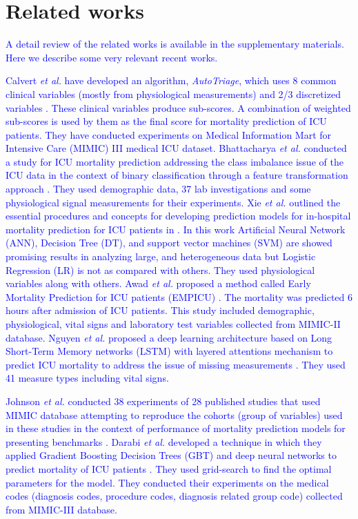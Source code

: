 \section{Related works} \label{s:related}
\textcolor{blue}{A detail review of the related works is available in the supplementary materials. Here we describe some very relevant recent works.}

\textcolor{blue}{Calvert \textit{et al.} have developed an algorithm, \textit{AutoTriage}, which uses 8 common clinical variables (mostly from physiological measurements) and 2/3 discretized variables \cite{Calvert2016}. These clinical variables produce sub-scores. A combination of weighted sub-scores is used by them as the final score for mortality prediction of ICU patients. They have conducted experiments on Medical Information Mart for Intensive Care (MIMIC) III medical ICU dataset. Bhattacharya \textit{et al.} conducted a study for ICU mortality prediction addressing the class imbalance issue of the ICU data in the context of binary classification through a feature transformation approach \cite{Bhattacharya2017}. They used demographic data, 37 lab investigations and some physiological signal measurements for their experiments. Xie \textit{et al.} outlined the essential procedures and concepts for developing prediction models for in-hospital mortality prediction for ICU patients in \cite{Xie2017}. In this work Artificial Neural Network (ANN), Decision Tree (DT), and support vector machines (SVM) are showed promising results in analyzing large, and heterogeneous data but Logistic Regression (LR) is not as compared with others. They used physiological variables along with others. Awad \textit{et al.} proposed a method called Early Mortality Prediction for ICU patients (EMPICU) \cite{Awad2017}. The mortality was predicted 6 hours after admission of ICU patients. This study included demographic, physiological, vital signs and laboratory test variables collected from MIMIC-II database. Nguyen \textit{et al.} proposed a deep learning architecture based on Long Short-Term Memory networks (LSTM) with layered attentions mechanism to predict ICU mortality to address the issue of missing measurements \cite{Nguyen2017}. They used 41 measure types including vital signs.} 

\textcolor{blue}{Johnson \textit{et al.} conducted 38 experiments of 28 published studies that used MIMIC database attempting to reproduce the cohorts (group of variables) used in these studies in the context of performance of mortality prediction models for presenting benchmarks \cite{Johnson2nd2017}. Darabi \textit{et al.} developed a technique in which they applied Gradient Boosting Decision Trees (GBT) and deep neural networks to predict mortality of ICU patients \cite{Darabi2018}. They used grid-search to find the optimal parameters for the model. They conducted their experiments on the medical codes (diagnosis codes, procedure codes, diagnosis related group code) collected from MIMIC-III database.} 

